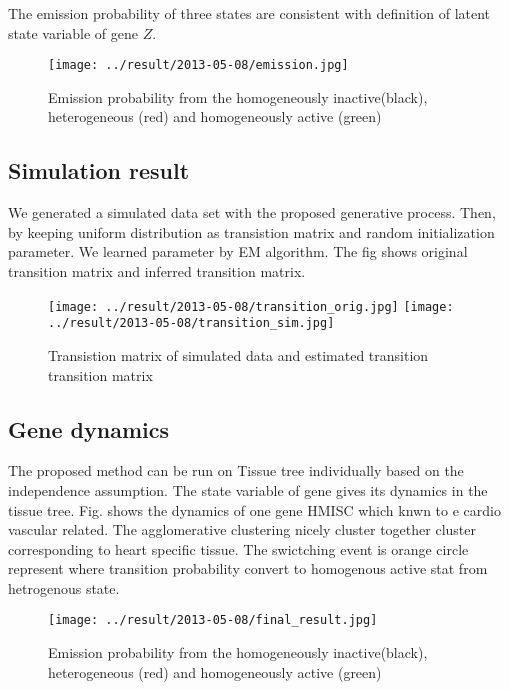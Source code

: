 \documentclass{article}
\begin{document}
The emission probability of three states are consistent with definition of latent state variable
of gene $Z$.
\begin{figure}[h]
	\begin{center}
		\texttt{[image: ../result/2013-05-08/emission.jpg]}
	\end{center}
	\caption{Emission probability from the homogeneously inactive(black), heterogeneous (red) and homogeneously active (green)}
	\label{fig:emission}
\end{figure}


\subsection{Simulation result}
We generated a simulated data set with the proposed generative process. Then, by keeping uniform
distribution as transistion matrix and random initialization parameter. We learned parameter 
by EM algorithm. The fig shows original transition matrix and inferred transition matrix.
\begin{figure}[h]
	\begin{center}
		\texttt{[image: ../result/2013-05-08/transition\_orig.jpg]}
		\texttt{[image: ../result/2013-05-08/transition\_sim.jpg]}
	\end{center}
	\caption{Transistion matrix of simulated data and estimated transition transition matrix}
	\label{fig:transistion2}
\end{figure}
\subsection{Gene dynamics}

The proposed method can be run on Tissue tree individually based on the independence assumption.
The state variable of gene gives its dynamics in the tissue tree. Fig. shows the dynamics
of one gene HMISC which knwn to e cardio vascular related. The agglomerative clustering nicely 
cluster together cluster corresponding to heart specific tissue. The swictching event is 
orange circle represent where transition probability convert to homogenous active stat from
hetrogenous state.

\begin{figure}[h]
	\begin{center}
		\texttt{[image: ../result/2013-05-08/final\_result.jpg]}
	\end{center}
	\caption{Emission probability from the homogeneously inactive(black), heterogeneous (red) and homogeneously active (green)}
	\label{fig:dynamics}
\end{figure}
\end{document}
